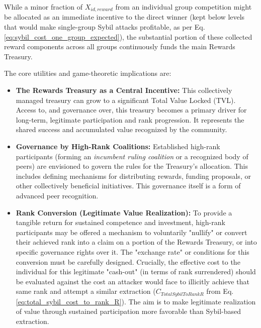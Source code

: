 \documentclass{article}
\begin{document}
\begin{CJK}{UTF8}{gbsn}
        While a minor fraction of $X_{id,reward}$ from an individual group competition might be allocated as an immediate incentive to the direct winner (kept below levels that would make single-group Sybil attacks profitable, as per Eq. \ref{eq:sybil_cost_one_group_expected}), the substantial portion of these collected reward components across all groups continuously funds the main Rewards Treasury.

        The core utilities and game-theoretic implications are:
        \begin{itemize}
            \item \textbf{The Rewards Treasury as a Central Incentive:} This collectively managed treasury can grow to a significant Total Value Locked (TVL). Access to, and governance over, this treasury becomes a primary driver for long-term, legitimate participation and rank progression. It represents the shared success and accumulated value recognized by the community.

            \item \textbf{Governance by High-Rank Coalitions:} Established high-rank participants (forming an \textit{incumbent ruling coalition} or a recognized body of peers) are envisioned to govern the rules for the Treasury's allocation. This includes defining mechanisms for distributing rewards, funding proposals, or other collectively beneficial initiatives. This governance itself is a form of advanced peer recognition.

            \item \textbf{Rank Conversion (Legitimate Value Realization):} To provide a tangible return for sustained competence and investment, high-rank participants may be offered a mechanism to voluntarily "nullify" or convert their achieved rank into a claim on a portion of the Rewards Treasury, or into specific governance rights over it. The "exchange rate" or conditions for this conversion must be carefully designed. Crucially, the effective cost to the individual for this legitimate "cash-out" (in terms of rank surrendered) should be evaluated against the cost an attacker would face to illicitly achieve that same rank and attempt a similar extraction ($C_{TotalSybilToRankR}$ from Eq. \ref{eq:total_sybil_cost_to_rank_R}). The aim is to make legitimate realization of value through sustained participation more favorable than Sybil-based extraction.


\end{itemize}
\end{CJK}
\end{document}
